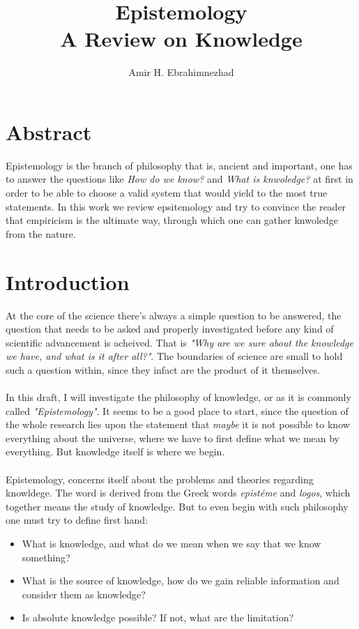 \documentclass[9pt,a4paper,twocolumn]{article}
\title{Epistemology \\ \large A Review on Knowledge}
\author{Amir H. Ebrahimnezhad}
\date{}
\newcounter{theo}
\newcounter{def}
\begin{document}
        \maketitle
        \tableofcontents
        \section*{Abstract}
                Epistemology is the branch of philosophy that is, ancient and important, one has to answer the questions like \textit{How do we know?} and \textit{What is knwoledge?} at first in order to be able to choose a valid system that would yield to the most true statements. In this work we review epsitemology and try to convince the reader that empiricism is the ultimate way, through which one can gather knwoledge from the nature.
        \section{Introduction}
            \indent At the core of the science there's always a simple question to be answered, the question that needs to be asked and properly investigated before any kind of scientific advancement is acheived. That is \textit{"Why are we sure about the knowledge we have, and what is it after all?"}. The boundaries of science are small to hold such a question within, since they infact are the product of it themselves.
            \\
            \\
            \indent In this draft, I will investigate the philosophy of knowledge, or as it is commonly called \textit{"Epistemology"}. It seems to be a good place to start, since the question of the whole research lies upon the statement that \textit{maybe} it is not possible to know everything about the universe, where we have to first define what we mean by everything. But knowledge itself is where we begin.
            \\
            \\
            \indent Epistemology, concerns itself about the problems and theories regarding knowldege. The word is derived from the Greek words \textit{epistéme} and \textit{logos}, which together means the study of knowledge. But to even begin with such philosophy one must try to define first hand:
            \begin{itemize}
                \item What is knowledge, and what do we mean when we say that we know something?
                \item What is the source of knowledge, how do we gain reliable information and consider them as knowledge?
                \item Is absolute knowledge possible? If not, what are the limitation?\cite{CW/E}
            \end{itemize}
\end{document}
